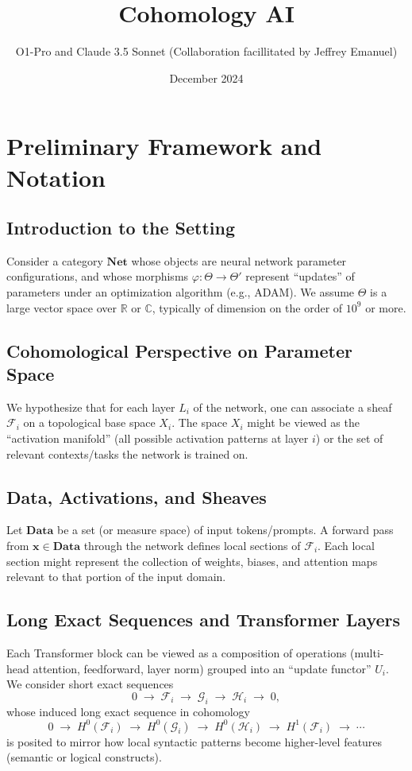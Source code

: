\documentclass{article}
\title{Cohomology AI}
\author{O1-Pro and Claude 3.5 Sonnet (Collaboration facillitated by Jeffrey Emanuel)}
\date{December 2024}
\begin{document}
\maketitle

\section{Preliminary Framework and Notation}

\subsection{Introduction to the Setting}
Consider a category $\mathbf{Net}$ whose objects are neural network parameter configurations, and whose morphisms $\varphi: \Theta \to \Theta'$ represent “updates” of parameters under an optimization algorithm (e.g., ADAM). We assume $\Theta$ is a large vector space over $\mathbb{R}$ or $\mathbb{C}$, typically of dimension on the order of $10^{9}$ or more.

\subsection{Cohomological Perspective on Parameter Space}
We hypothesize that for each layer $L_i$ of the network, one can associate a sheaf $\mathcal{F}_i$ on a topological base space $X_i$. The space $X_i$ might be viewed as the “activation manifold” (all possible activation patterns at layer $i$) or the set of relevant contexts/tasks the network is trained on.

\subsection{Data, Activations, and Sheaves}
Let $\mathbf{Data}$ be a set (or measure space) of input tokens/prompts. A forward pass from $\mathbf{x}\in \mathbf{Data}$ through the network defines local sections of $\mathcal{F}_i$. Each local section might represent the collection of weights, biases, and attention maps relevant to that portion of the input domain.

\subsection{Long Exact Sequences and Transformer Layers}
Each Transformer block can be viewed as a composition of operations (multi-head attention, feedforward, layer norm) grouped into an “update functor” $U_i$. We consider short exact sequences
\[
0 \;\longrightarrow\; \mathcal{F}_{i} \;\longrightarrow\; \mathcal{G}_{i} \;\longrightarrow\; \mathcal{H}_{i} \;\longrightarrow\; 0,
\]
whose induced long exact sequence in cohomology
\[
0 \;\to\; H^{0}(\mathcal{F}_i) \;\to\; H^{0}(\mathcal{G}_i) \;\to\; H^{0}(\mathcal{H}_i) \;\to\; H^{1}(\mathcal{F}_i) \;\to\; \cdots
\]
is posited to mirror how local syntactic patterns become higher-level features (semantic or logical constructs).
\end{document}
